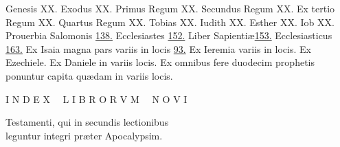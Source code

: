 \documentclass[a5paper,10pt]{book}
\def\ae{æ}
\begin{document}
\begin{multicols}{2}
\par \noindent Genesis \hfill XX.
\newline Exodus \hfill XX.
\newline Primus Regum \hfill XX.
\newline Secundus Regum \hfill XX.
\newline Ex tertio Regum \hfill XX.
\newline Quartus Regum \hfill XX.
\newline Tobias \hfill XX.
\newline Iudith \hfill XX.
\newline Esther \hfill XX.
\newline Iob \hfill XX.
\newline Prouerbia Salomonis \hfill \hyperlink{page.138}{138.}
\newline Ecclesiastes \hfill \hyperlink{page.152}{152.}
\newline Liber Sapienti\ae \hfill \hyperlink{page.153}{153.}
\newline Ecclesiasticus \hfill \hyperlink{page.163}{163.}
\newline Ex Isaia magna pars variis in
\newline \indent locis \hfill \hyperlink{page.93}{93.}
\newline Ex Ieremia variis in locis.
\newline Ex Ezechiele.
\newline Ex Daniele in variis locis.
\newline Ex omnibus fere duodecim
\newline \indent prophetis ponuntur capita
\newline \indent qu\ae dam in variis locis. %
\end{multicols}
\vspace{+1em}

\begin{center} \color{red} \Large
I N D E X \ \ L I B R O R V M \ \ N O V I
\end{center}
\vspace{-1.5em}

\begin{center} \large
Testamenti, qui in secundis lectionibus\\
leguntur integri pr\ae ter Apocalypsim.
\end{center}
\end{document}
